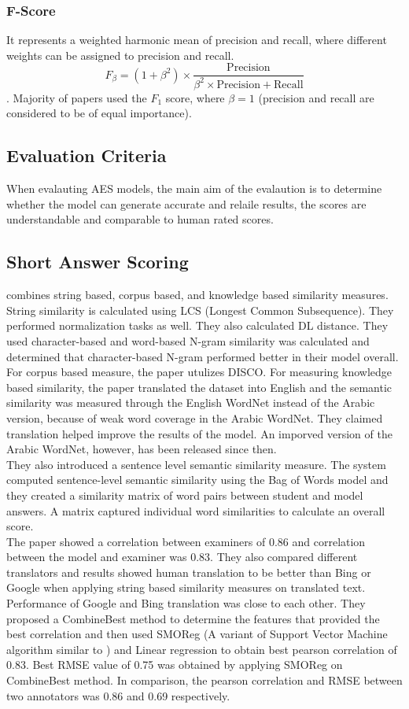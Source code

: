 \documentclass{article}
\begin{document}
\subsubsection{F-Score}
It represents a weighted harmonic mean of precision and recall, where different weights can be assigned to precision and recall.
$$F_\beta = (1 + \beta^2) \times \frac{\text{Precision}}{\beta^2 \times \text{Precision} + \text{Recall}}$$. Majority of papers used the $F_1$ score, where $\beta = 1$ (precision and recall are considered to be of equal importance).
\subsection{Evaluation Criteria}
When evalauting AES models, the main aim of the evalaution is to determine whether the model can generate accurate and relaile results, the scores are understandable and comparable to human rated scores.

\subsection{Short Answer Scoring}
\textbf{\textcite{1_gomaa2014arabic}} combines string based, corpus based, and knowledge based similarity measures. String similarity is calculated using LCS (Longest Common Subsequence). They performed normalization tasks as well. They also calculated DL distance. They used character-based and word-based N-gram similarity was calculated and determined that character-based N-gram performed better in their model overall. 
For corpus based measure, the paper utulizes DISCO. For measuring knowledge based similarity, the paper translated the dataset into English and the semantic similarity was measured through the English WordNet instead of the Arabic version, because of weak word coverage in the Arabic WordNet. They claimed translation helped improve the results of the model. An imporved version of the Arabic WordNet, however, has been released since then. \\ They also introduced a sentence level semantic similarity measure. The system computed sentence-level semantic similarity using the Bag of Words model and they created a similarity matrix of word pairs between student and model answers. A matrix captured individual word similarities to calculate an overall score. \\ The paper showed a correlation between examiners of 0.86 and correlation between the model and examiner was 0.83. They also compared different translators and results showed human translation to be better than Bing or Google when applying string based similarity measures on translated text. Performance of Google and Bing translation was close to each other. They proposed a CombineBest method to determine the features that provided the best correlation and then used SMOReg (A variant of Support Vector Machine algorithm similar to \textcite{4_abdeljaber2021wordnet}) and Linear regression to obtain best pearson correlation of 0.83. Best RMSE value of 0.75 was obtained by applying SMOReg on CombineBest method. In comparison, the pearson correlation and RMSE between two annotators was 0.86 and 0.69 respectively.
\end{document}
